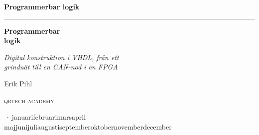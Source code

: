 %
\providecommand{\bookversion}{}
\newcommand{\bookdate}{\number\day\space\ifcase\month\or januari\or februari\or mars\or april\or
  maj\or juni\or juli\or augusti\or september\or oktober\or november\or december\fi\space
  \number\year}
\newcommand{\bookedition}{\ifx\bookversion\empty\else\bookversion\,·\,\fi\bookdate}

\thispagestyle{empty}
\vspace*{2.2in}
\begin{flushright}
  {\Large\bfseries Programmerbar logik}
\end{flushright}
\cleardoublepage

\thispagestyle{empty}
\vspace*{1.1in}
\begin{flushleft}
  {\color{accent}\rule{0.9in}{2.5pt}}\par\vspace{1.4ex}
  {\fontsize{32}{38}\selectfont\bfseries Programmerbar\\[0.15ex] logik\par}
  \vspace{2.2ex}
  {\Large\itshape Digital konstruktion i VHDL, från ett\\grindnät till en CAN-nod i en FPGA\par}
  \vspace{1.2in}
  {\large Erik Pihl\par}
  \vfill
  {\small\scshape\lsstyle qrtech academy\par}
  \vspace{0.6ex}
  {\small\color{muted} \bookedition\par}
\end{flushleft}
\newpage

